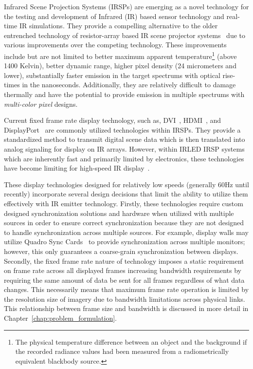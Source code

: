 \label{chap:introduction}

Infrared Scene Projection Systems (IRSPs) are emerging as a novel technology for the testing and development of Infrared (IR) based sensor technology and real-time IR simulations. They provide a compelling alternative to the older entrenched technology of resistor-array based IR scene projector systems~\cite{PritchardEtAl1998,WilliamsEtAl2005} due to various improvements over the competing technology. These improvements include but are not limited to better maximum apparent temperature\footnote{The physical temperature difference between an object and the background if the recorded radiance values had been measured from a radiometrically equivalent blackbody source.} (above 1400 Kelvin), better dynamic range, higher pixel density (24 micrometers and lower), substantially faster emission in the target spectrums with optical rise-times in the nanoseconds. Additionally, they are relatively difficult to damage thermally and have the potential to provide emission in multiple spectrums with \emph{multi-color pixel} designs.

Current fixed frame rate display technology, such as, DVI~\cite{DDWG1999}, HDMI~\cite{HDMIForum2018}, and DisplayPort~\cite{BhowmikEtAl2012} are commonly utilized technologies within IRSPs. They provide a standardized method to transmit digital scene data which is then translated into analog signaling for display on IR arrays. However, within IRLED IRSP systems which are inherently fast and primarily limited by electronics, these technologies have become limiting for high-speed IR display~\cite{LaVeignePrewarski2013}.

These display technologies designed for relatively low speeds (generally 60Hz until recently) incorporate several design decisions that limit the ability to utilize them effectively with IR emitter technology. Firstly, these technologies require custom designed synchronization solutions and hardware when utilized with multiple sources in order to ensure correct synchronization because they are not designed to handle synchronization across multiple sources. For example, display walls may utilize Quadro Sync Cards~\cite{NVIDIA2020_2} to provide synchronization across multiple monitors; however, this only guarantees a coarse-grain synchronization between displays. Secondly, the fixed frame rate nature of technology imposes a static requirement on frame rate across all displayed frames increasing bandwidth requirements by requiring the same amount of data be sent for all frames regardless of what data changes. This necessarily means that maximum frame rate operation is limited by the resolution size of imagery due to bandwidth limitations across physical links. This relationship between frame size and bandwidth is discussed in more detail in Chapter~\ref{chap:problem_formulation}.


